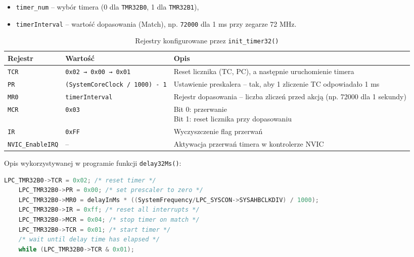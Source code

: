 \documentclass[a4paper,12pt]{report}
\begin{document}
\begin{itemize}
    \item \texttt{timer\_num} – wybór timera (0 dla \texttt{TMR32B0}, 1 dla \texttt{TMR32B1}),
    \item \texttt{timerInterval} – wartość dopasowania (Match), np. \texttt{72000} dla 1 ms przy zegarze 72 MHz.
\end{itemize}

\begin{table}[h!]
\centering
{
    \small
    \begin{tabularx}{\textwidth}{|l|p{4cm}|X|}
    \hline
    \textbf{Rejestr} & \textbf{Wartość} & \textbf{Opis} \\
    \hline
    \texttt{TCR} & \texttt{0x02 → 0x00 → 0x01} & Reset licznika (TC, PC), a następnie uruchomienie timera \\
    \hline
    \texttt{PR} & \texttt{(SystemCoreClock / 1000) - 1} & Ustawienie preskalera – tak, aby 1 zliczenie TC odpowiadało 1 ms \\
    \hline
    \texttt{MR0} & \texttt{timerInterval} & Rejestr dopasowania – liczba zliczeń przed akcją (np. 72000 dla 1 sekundy) \\
    \hline
    \texttt{MCR} & \texttt{0x03} & \makecell[l]{Bit 0: przerwanie \\ Bit 1: reset licznika przy dopasowaniu} \\
    \hline
    \texttt{IR} & \texttt{0xFF} & Wyczyszczenie flag przerwań \\
    \hline
    \texttt{NVIC\_EnableIRQ} & -- & Aktywacja przerwań timera w kontrolerze NVIC \\
    \hline
    \end{tabularx}
}
\caption{Rejestry konfigurowane przez \texttt{init\_timer32()}}
\end{table}

Opis wykorzystywanej w programie funkcji \texttt{delay32Ms()}:\\
\begin{lstlisting}[language=C]
    LPC_TMR32B0->TCR = 0x02; /* reset timer */
    LPC_TMR32B0->PR = 0x00; /* set prescaler to zero */
    LPC_TMR32B0->MR0 = delayInMs * ((SystemFrequency/LPC_SYSCON->SYSAHBCLKDIV) / 1000);
    LPC_TMR32B0->IR = 0xff; /* reset all interrupts */
    LPC_TMR32B0->MCR = 0x04; /* stop timer on match */
    LPC_TMR32B0->TCR = 0x01; /* start timer */
    /* wait until delay time has elapsed */
    while (LPC_TMR32B0->TCR & 0x01);
\end{lstlisting}
\end{document}

